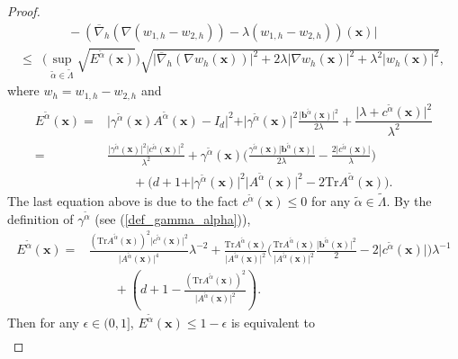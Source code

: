 \documentclass[12pt]{amsart}
\newcommand{\boldx}{\boldsymbol{x}}
\theoremstyle{definition}
\theoremstyle{remark}
\begin{document}
\begin{proof}
\begin{align}
\nonumber 
& \qquad -(\overline{\nabla}_{h}(\nabla (w_{1,h}-w_{2,h}))-\lambda(w_{1,h}-w_{2,h}))
(\boldx)\vert \\
\nonumber 
\leq & \big(\sup_{\tilde{\alpha}\in \tilde{\Lambda}}\sqrt{E^{\tilde{\alpha}}(\boldx)}
\big)\sqrt{\vert \overline{\nabla}_{h}(\nabla w_{h}(\boldx))\vert^{2} 
+2\lambda \vert \nabla w_{h}(\boldx)\vert^{2} 
+ \lambda^{2}\vert w_{h}(\boldx)\vert^{2}},
\end{align}
where $w_{h}=w_{1,h} - w_{2,h}$ and 
\begin{align*}
E^{\tilde{\alpha}}(\boldx)
= & \vert \gamma^{\tilde{\alpha}}(\boldx)
A^{\tilde{\alpha}}(\boldx) 
- I_{d} \vert^{2} + \vert \gamma^{\tilde{\alpha}}(\boldx) \vert^{2} 
\frac{\vert \boldsymbol{b}^{\tilde{\alpha}}(\boldx) \vert^{2}}{2\lambda} 
+ \dfrac{\vert \lambda + c^{\tilde{\alpha}}(\boldx) \vert^{2}}{\lambda^{2}}\\
= & \frac{\vert \gamma^{\tilde{\alpha}}(\boldx) \vert^{2}
\vert c^{\tilde{\alpha}}(\boldx)\vert^{2}}{\lambda^{2}}
+\gamma^{\tilde{\alpha}}(\boldx)\big( \frac{
\gamma^{\tilde{\alpha}}(\boldx)\vert \boldsymbol{b}^{\tilde{\alpha}}(\boldx)
\vert}{2\lambda} - \frac{2\vert c^{\tilde{\alpha}}(\boldx)\vert}{\lambda}\big)\\
\nonumber  
& \qquad + \big(d+1 +\vert \gamma^{\tilde{\alpha}}(\boldx) \vert^{2}
\vert A^{\tilde{\alpha}}(\boldx)\vert^{2} - 2 \text{Tr} 
A^{\tilde{\alpha}}(\boldx)\big).
\end{align*}
The last equation above is due to the fact $c^{\tilde{\alpha}}(\boldx)\leq 0$ 
for any $\tilde{\alpha}\in \tilde{\Lambda}$.
By the definition of $\gamma^{\tilde{\alpha}}$ (see (\ref{def_gamma_alpha})), 
\begin{align*}
E^{\tilde{\alpha}}(\boldx) = & \frac{(\text{Tr}A^{\tilde{\alpha}}(\boldx))^{2}
\vert c^{\tilde{\alpha}}(\boldx)\vert^{2}}{\vert A^{\tilde{\alpha}}
(\boldx) \vert^{4}}\lambda^{-2} 
+ \frac{\text{Tr}A^{\tilde{\alpha}}(\boldx)}{\vert A^{\tilde{\alpha}}
(\boldx) \vert^{2}}\big( \frac{\text{Tr}A^{\tilde{\alpha}}(\boldx)}{\vert 
A^{\tilde{\alpha}}(\boldx) \vert^{2}} \frac{\vert \boldsymbol{b}^{\tilde{\alpha}} 
(\boldx)\vert^{2}}{2} - 2 \vert c^{\tilde{\alpha}}(\boldx)\vert\big)\lambda^{-1}\\
& \qquad + (d+1 - \frac{(\text{Tr}A^{\tilde{\alpha}}
(\boldx))^{2}}{\vert A^{\tilde{\alpha}}(\boldx) \vert^{2}}).
\end{align*}
Then for any $\epsilon \in (0,1]$, $E^{\tilde{\alpha}}(\boldx)\leq 1 - \epsilon$ 
is equivalent to 
\begin{align*}

\end{align*}
\end{proof}
\end{document}
